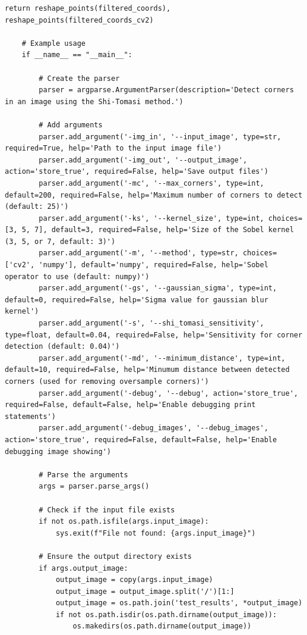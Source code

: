 \documentclass[11pt, conference, letterpaper]{IEEEtran}
\begin{document}
\begin{lstlisting}[style=python, caption={\texttt{shi\_tomasi\_corners.py}}, label={lst:stc}]
        return reshape_points(filtered_coords), reshape_points(filtered_coords_cv2)
    
    # Example usage
    if __name__ == "__main__":
    
        # Create the parser
        parser = argparse.ArgumentParser(description='Detect corners in an image using the Shi-Tomasi method.')
    
        # Add arguments
        parser.add_argument('-img_in', '--input_image', type=str, required=True, help='Path to the input image file')
        parser.add_argument('-img_out', '--output_image', action='store_true', required=False, help='Save output files')
        parser.add_argument('-mc', '--max_corners', type=int, default=200, required=False, help='Maximum number of corners to detect (default: 25)')
        parser.add_argument('-ks', '--kernel_size', type=int, choices=[3, 5, 7], default=3, required=False, help='Size of the Sobel kernel (3, 5, or 7, default: 3)')
        parser.add_argument('-m', '--method', type=str, choices=['cv2', 'numpy'], default='numpy', required=False, help='Sobel operator to use (default: numpy)')
        parser.add_argument('-gs', '--gaussian_sigma', type=int, default=0, required=False, help='Sigma value for gaussian blur kernel')
        parser.add_argument('-s', '--shi_tomasi_sensitivity', type=float, default=0.04, required=False, help='Sensitivity for corner detection (default: 0.04)')
        parser.add_argument('-md', '--minimum_distance', type=int, default=10, required=False, help='Minumum distance between detected corners (used for removing oversample corners)')
        parser.add_argument('-debug', '--debug', action='store_true', required=False, default=False, help='Enable debugging print statements')
        parser.add_argument('-debug_images', '--debug_images', action='store_true', required=False, default=False, help='Enable debugging image showing')
    
        # Parse the arguments
        args = parser.parse_args()
    
        # Check if the input file exists
        if not os.path.isfile(args.input_image):
            sys.exit(f"File not found: {args.input_image}")
        
        # Ensure the output directory exists
        if args.output_image:
            output_image = copy(args.input_image)
            output_image = output_image.split('/')[1:]
            output_image = os.path.join('test_results', *output_image)
            if not os.path.isdir(os.path.dirname(output_image)):
                os.makedirs(os.path.dirname(output_image))
    

\end{lstlisting}
\end{document}
